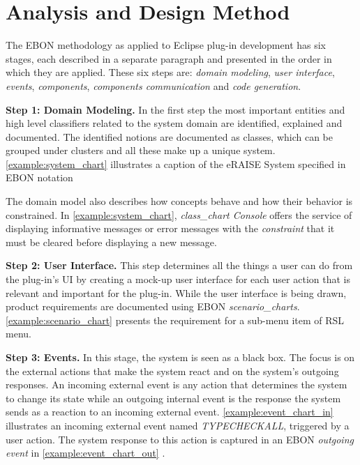\documentclass[conference]{IEEEtran}
\begin{document}
\section{Analysis and Design Method}
\label{sec:analys-design-meth}

The EBON methodology as applied to Eclipse plug-in development has six
stages, each described in a separate paragraph and presented in the
order in which they are applied. These six steps are: \emph{domain
  modeling}, \emph{user interface}, \emph{events}, \emph{components},
\emph{components communication} and \emph{code generation}.

%
{\bf Step 1: Domain Modeling.} 
In the first step the most
important entities and high level classifiers related to the system
domain are identified, explained and documented. The identified
notions are documented as classes, which can be
grouped under clusters and all these make up a unique system.
\autoref{example:system_chart} illustrates a caption of the eRAISE
System specified in EBON notation



The domain model also describes how concepts behave and how their
behavior is constrained. In \autoref{example:system_chart}, \emph{class\_chart
  Console} offers the service of displaying informative messages or
error messages with the \emph{constraint}
that it must be cleared before displaying a new
message.


%
{\bf Step 2: User Interface.} 
This step determines all the things a
user can do from the plug-in's UI by creating a mock-up user interface
for each user action that is relevant
and important for the plug-in. While the user interface is being
drawn, product requirements are
documented using EBON \emph{scenario\_charts}.  
\autoref{example:scenario_chart} presents the requirement for a 
sub-menu item of RSL menu.



%
{\bf Step 3: Events.}
In this stage, the system is seen as a black
box. The focus is on the external actions that make the system react
and on the system's outgoing responses. An incoming external event is
any action that determines the system to
change its state while an outgoing internal event is the
response the system sends as a reaction to an incoming external event.
\autoref{example:event_chart_in} illustrates an incoming external
event named
\emph{TYPECHECKALL}, triggered by a user action. The system response
to
this action is captured in an EBON \emph{outgoing event} in
\autoref{example:event_chart_out} .
\end{document}
